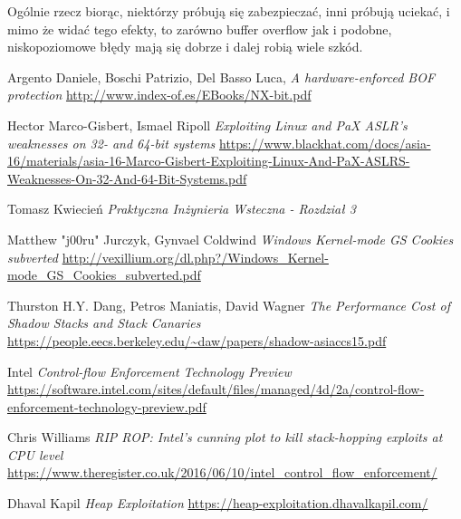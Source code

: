 \documentclass[polish]{kbk}
\begin{document}
Ogólnie rzecz biorąc, niektórzy próbują się zabezpieczać, inni próbują uciekać, i mimo że widać tego efekty, to zarówno buffer overflow jak i podobne, niskopoziomowe błędy mają się dobrze i dalej robią wiele szkód.

\begin{thebibliography}{99}
 Argento Daniele, Boschi Patrizio, Del Basso Luca, 
\textit{A hardware-enforced BOF protection}
\url{http://www.index-of.es/EBooks/NX-bit.pdf}

 Hector Marco-Gisbert, Ismael Ripoll 
\textit{Exploiting Linux and PaX ASLR’s weaknesses on 32- and 64-bit systems}
\url{https://www.blackhat.com/docs/asia-16/materials/asia-16-Marco-Gisbert-Exploiting-Linux-And-PaX-ASLRS-Weaknesses-On-32-And-64-Bit-Systems.pdf}

 Tomasz Kwiecień
\textit{Praktyczna Inżynieria Wsteczna - Rozdział 3}

 Matthew "j00ru" Jurczyk, Gynvael Coldwind
\textit{Windows Kernel-mode GS Cookies subverted}
\url{http://vexillium.org/dl.php?/Windows_Kernel-mode_GS_Cookies_subverted.pdf}

 Thurston H.Y. Dang, Petros Maniatis, David Wagner 
\textit{The Performance Cost of Shadow Stacks and Stack Canaries}
\url{https://people.eecs.berkeley.edu/~daw/papers/shadow-asiaccs15.pdf}

 Intel 
\textit{Control-flow Enforcement Technology Preview }
\url{https://software.intel.com/sites/default/files/managed/4d/2a/control-flow-enforcement-technology-preview.pdf}

  Chris Williams 
\textit{RIP ROP: Intel's cunning plot to kill stack-hopping exploits at CPU level}
\url{https://www.theregister.co.uk/2016/06/10/intel_control_flow_enforcement/}

  Dhaval Kapil
\textit{Heap Exploitation}
\url{https://heap-exploitation.dhavalkapil.com/}
\end{thebibliography}
\end{document}
